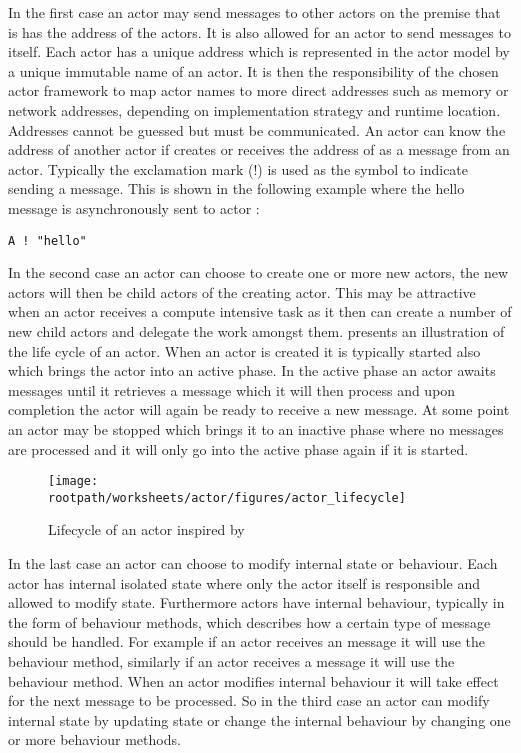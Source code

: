 In the first case an actor may send messages to other actors on the premise that is has the address of the actors. It is also allowed for an actor to send messages to itself. Each actor has a unique address which is represented in the actor model by a unique immutable name of an actor\cite[p. 2]{karmani2009actor}. It is then the responsibility of the chosen actor framework to map actor names to more direct addresses such as memory or network addresses, depending on implementation strategy and runtime location\cite[p. 3]{hewitt2014actor}. Addresses cannot be guessed but must be communicated. An actor  can know the address of another actor  if  creates  or receives the address of  as a message from an actor. Typically the exclamation mark (!) is used as the symbol to indicate sending a message. This is shown in the following example where the hello message is asynchronously sent to actor :
\begin{verbatim}
A ! "hello"
\end{verbatim}

In the second case an actor can choose to create one or more new actors, the new actors will then be child actors of the creating actor. This may be attractive when an actor receives a compute intensive task as it then can create a number of new child actors and delegate the work amongst them.  presents an illustration of the life cycle of an actor. When an actor is created it is typically started also which brings the actor into an active phase. In the active phase an actor awaits messages until it retrieves a message which it will then process and upon completion the actor will again be ready to receive a new message. At some point an actor may be stopped which brings it to an inactive phase where no messages are processed and it will only go into the active phase again if it is started.

\begin{figure}[ht!]
\centering
\texttt{[image: \\rootpath/worksheets/actor/figures/actor\_lifecycle]}
\caption{Lifecycle of an actor inspired by \cite[Figure 12]{subramaniam2011programming}}\label{fig:actor_lifecycle}
\end{figure}
In the last case an actor can choose to modify internal state or behaviour. Each actor has internal isolated state where only the actor itself is responsible and allowed to modify state. Furthermore actors have internal behaviour, typically in the form of behaviour methods, which describes how a certain type of message should be handled. For example if an actor receives an  message it will use the  behaviour method, similarly  if an actor receives a  message it will use the  behaviour method. When an actor modifies internal behaviour it will take effect for the next message to be processed. So in the third case an actor can modify internal state by updating state or change the internal behaviour by changing one or more behaviour methods.

